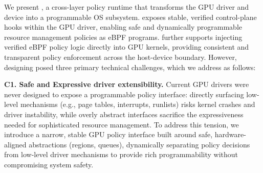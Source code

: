 We present \sys{}, a cross-layer policy runtime that transforms the GPU driver and device into a programmable OS subsystem. \sys{} exposes stable, verified control-plane hooks within the GPU driver, enabling safe and dynamically programmable resource management policies as eBPF programs. \sys{} further supports injecting verified eBPF policy logic directly into GPU kernels, providing consistent and transparent policy enforcement across the host-device boundary.
However, designing \sys{} posed three primary technical challenges, which we address as follows: 

\textbf{C1. Safe and Expressive driver extensibility.} Current GPU drivers were never designed to expose a programmable policy interface: directly surfacing low-level mechanisms (e.g., page tables, interrupts, runlists) risks kernel crashes and driver instability, while overly abstract interfaces sacrifice the expressiveness needed for sophisticated resource management. To address this tension, we introduce a narrow, stable GPU policy interface built around safe, hardware-aligned abstractions (regions, queues), dynamically separating policy decisions from low-level driver mechanisms to provide rich programmability without compromising system safety.


